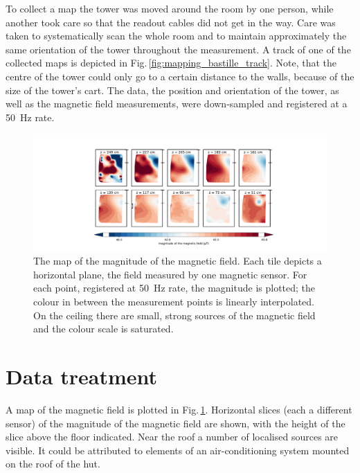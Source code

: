 To collect a map the tower was moved around the room by one person, while another took care so that the readout cables did not get in the way.
Care was taken to systematically scan the whole room and to maintain approximately the same orientation of the tower throughout the measurement. A track of one of the collected maps is depicted in Fig.\,\ref{fig:mapping_bastille_track}. Note, that the centre of the tower could only go to a certain distance to the walls, because of the size of the tower's cart.
The data, the position and orientation of the tower, as well as the magnetic field measurements, were down-sampled and registered at a \SI{50}{\hertz} rate.

\begin{figure}
  \centering
  \includegraphics[width=\linewidth]{gfx/mapping/lpsc/bastille_crane_away_rep_magnitude_low_range_crop.pdf}
  \caption{The map of the magnitude of the magnetic field. Each tile depicts a horizontal plane, the field measured by one magnetic sensor. For each point, registered at \SI{50}{\hertz} rate, the magnitude is plotted; the colour in between the measurement points is linearly interpolated. On the ceiling there are small, strong sources of the magnetic field and the colour scale is saturated.}\label{fig:mapping_bastille_magnitude}
\end{figure}




\section{Data treatment}
\label{sec:mapping_lpsc_data_treatment}
A map of the magnetic field is plotted in Fig.\,\ref{fig:mapping_bastille_magnitude}. Horizontal slices (each a different sensor) of the magnitude of the magnetic field are shown, with the height of the slice above the floor indicated. Near the roof a number of localised sources are visible. It could be attributed to elements of an air-conditioning system mounted on the roof of the hut.

